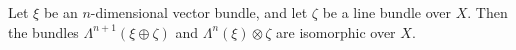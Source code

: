 Let $\xi$ be an $n$-dimensional vector bundle, and let $\zeta$ be a line bundle over $X$. Then the bundles $\Lambda^{n+1}(\xi \oplus \zeta)$ and $\Lambda^n(\xi) \otimes \zeta$ are isomorphic over $X$.
